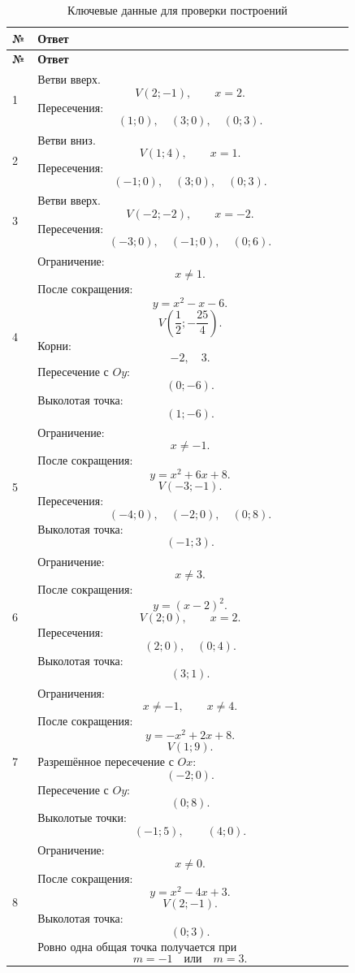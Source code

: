\documentclass[a4paper,12pt]{article}
\begin{document}
\small
\renewcommand{\arraystretch}{1.35}

\begin{longtable}{@{}p{0.07\linewidth}p{0.87\linewidth}@{}}
  \caption{Ключевые данные для проверки построений}\\
  \toprule
  \textbf{№} & \textbf{Ответ} \\
  \midrule
  \endfirsthead

  \toprule
  \textbf{№} & \textbf{Ответ} \\
  \midrule
  \endhead

  \bottomrule
  \endfoot

  1 &
  Ветви вверх.
  \[
    V(2;-1),\qquad x=2.
  \]
  Пересечения:
  \[
    (1;0),\quad(3;0),\quad(0;3).
  \]
  \\

  2 &
  Ветви вниз.
  \[
    V(1;4),\qquad x=1.
  \]
  Пересечения:
  \[
    (-1;0),\quad(3;0),\quad(0;3).
  \]
  \\

  3 &
  Ветви вверх.
  \[
    V(-2;-2),\qquad x=-2.
  \]
  Пересечения:
  \[
    (-3;0),\quad(-1;0),\quad(0;6).
  \]
  \\

  4 &
  Ограничение:
  \[
    x\ne 1.
  \]
  После сокращения:
  \[
    y=x^2-x-6.
  \]
  \[
    V\left(\frac12;-\frac{25}{4}\right).
  \]
  Корни:
  \[
    -2,\quad 3.
  \]
  Пересечение с \(Oy\):
  \[
    (0;-6).
  \]
  Выколотая точка:
  \[
    (1;-6).
  \]
  \\

  5 &
  Ограничение:
  \[
    x\ne -1.
  \]
  После сокращения:
  \[
    y=x^2+6x+8.
  \]
  \[
    V(-3;-1).
  \]
  Пересечения:
  \[
    (-4;0),\quad(-2;0),\quad(0;8).
  \]
  Выколотая точка:
  \[
    (-1;3).
  \]
  \\

  6 &
  Ограничение:
  \[
    x\ne 3.
  \]
  После сокращения:
  \[
    y=(x-2)^2.
  \]
  \[
    V(2;0),\qquad x=2.
  \]
  Пересечения:
  \[
    (2;0),\quad(0;4).
  \]
  Выколотая точка:
  \[
    (3;1).
  \]
  \\

  7 &
  Ограничения:
  \[
    x\ne -1,\qquad x\ne 4.
  \]
  После сокращения:
  \[
    y=-x^2+2x+8.
  \]
  \[
    V(1;9).
  \]
  Разрешённое пересечение с \(Ox\):
  \[
    (-2;0).
  \]
  Пересечение с \(Oy\):
  \[
    (0;8).
  \]
  Выколотые точки:
  \[
    (-1;5),\qquad(4;0).
  \]
  \\

  8 &
  Ограничение:
  \[
    x\ne 0.
  \]
  После сокращения:
  \[
    y=x^2-4x+3.
  \]
  \[
    V(2;-1).
  \]
  Выколотая точка:
  \[
    (0;3).
  \]
  Ровно одна общая точка получается при
  \[
    \boxed{m=-1\quad\text{или}\quad m=3}.
  \]
  \\


\end{longtable}
\end{document}
